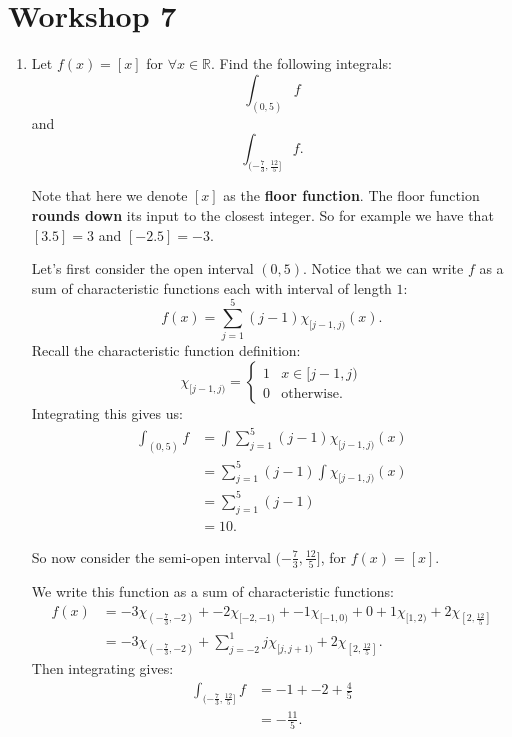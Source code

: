 \pagestyle{fancy}
\fancyhead{}

\section{Workshop 7}
\begin{enumerate}
    \item Let $f(x)=[x]$ for $\forall x\in\mathbb{R}$.    Find the following integrals:
    $$\int_{(0,5)}f$$
    and
    $$\int_{(-\frac{7}{3},\frac{12}{5}]}f.$$
    
    Note that here we denote $[x]$ as the \textbf{floor function}. The floor function \textbf{rounds down} its input to the closest integer. So for example we have that $[3.5]=3$ and $[-2.5]=-3$.

    Let's first consider the open interval $(0,5)$. Notice that we can write $f$ as a sum of characteristic functions each with interval of length $1$:
    $$f(x)=\sum_{j=1}^{5}(j-1)\chi_{[j-1,j)}(x).$$
    Recall the characteristic function definition:
    $$\chi_{[j-1,j)} =
    \left\{
    \begin{array}{ll}
	1  & \mbox{} x \in [j-1,j) \\
	0 & \mbox{otherwise}.
    \end{array}
    \right.$$
    Integrating this gives us:
    \begin{align*}
        \int_{(0,5)}f
        &=\int\sum_{j=1}^{5}(j-1)\chi_{[j-1,j)}(x) \\
        &=\sum_{j=1}^{5}(j-1)\int\chi_{[j-1,j)}(x) \\
        &=\sum_{j=1}^{5}(j-1) \\
        &=10.
    \end{align*}

    \newpage

    So now consider the semi-open interval $(-\frac{7}{3},\frac{12}{5}]$, for $f(x)=[x]$.

    We write this function as a sum of characteristic functions:
    \begin{align*}
        f(x)
        &=-3\chi_{(-\frac{7}{3},-2)}+-2\chi_{[-2,-1)}+-1\chi_{[-1,0)}+0
        +1\chi_{[1,2)}+2\chi_{[2,\frac{12}{5}]} \\
        &=-3\chi_{(-\frac{7}{3},-2)}+\sum_{j=-2}^{1}j\chi_{[j,j+1)}+2\chi_{[2,\frac{12}{5}]}.
    \end{align*}
    Then integrating gives:
    \begin{align*}
        \int_{(-\frac{7}{3},\frac{12}{5}]}f
        &=-1+-2+\frac{4}{5} \\
        &=-\frac{11}{5}.
    \end{align*}


\end{enumerate}
